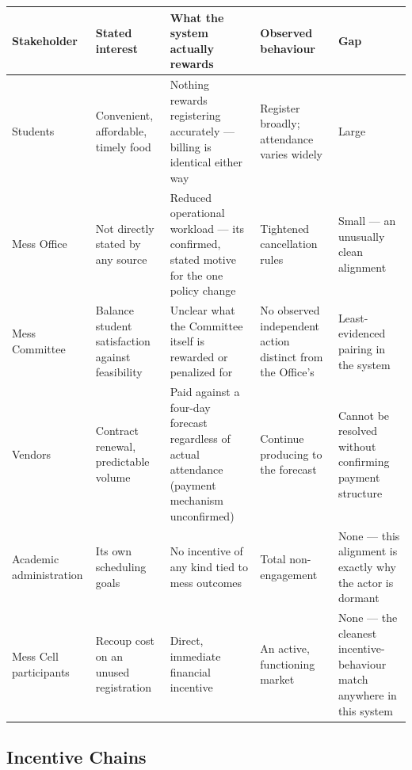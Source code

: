 \documentclass[11pt]{article}
\begin{document}
{\small\setlength{\tabcolsep}{4pt}
\begin{longtable}{L{0.14\textwidth}L{0.18\textwidth}L{0.24\textwidth}L{0.18\textwidth}L{0.14\textwidth}}
\toprule
\textbf{Stakeholder} & \textbf{Stated interest} & \textbf{What the system actually
rewards} & \textbf{Observed behaviour} & \textbf{Gap} \\
\midrule
\endhead
Students & Convenient, affordable, timely food & Nothing rewards registering
accurately --- billing is identical either way & Register broadly; attendance
varies widely & Large \\[4pt]
Mess Office & Not directly stated by any source & Reduced operational workload ---
its confirmed, stated motive for the one policy change & Tightened cancellation
rules & Small --- an unusually clean alignment \\[4pt]
Mess Committee & Balance student satisfaction against feasibility & Unclear what
the Committee itself is rewarded or penalized for & No observed independent action
distinct from the Office's & Least-evidenced pairing in the system \\[4pt]
Vendors & Contract renewal, predictable volume & Paid against a four-day forecast
regardless of actual attendance (payment mechanism unconfirmed) & Continue
producing to the forecast & Cannot be resolved without confirming payment structure \\[4pt]
Academic administration & Its own scheduling goals & No incentive of any kind tied
to mess outcomes & Total non-engagement & None --- this alignment is exactly why the
actor is dormant \\[4pt]
Mess Cell participants & Recoup cost on an unused registration & Direct, immediate
financial incentive & An active, functioning market & None --- the cleanest
incentive-behaviour match anywhere in this system \\
\bottomrule
\end{longtable}}

\subsection{Incentive Chains}
\end{document}
